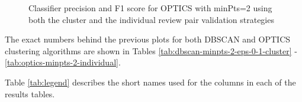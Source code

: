 \begin{figure}[ht]
\begin{center}
{\label{fig:subfig3}}
\caption{Classifier precision and F1 score for OPTICS with minPts=2 using both the cluster and the individual review pair validation strategies}    
\label{optics-minpts-2}
\end{center}
\end{figure}

\clearpage
The exact numbers behind the previous plots for both DBSCAN and OPTICS clustering algorithms are shown in Tables \ref{tab:dbscan-minpts-2-eps-0-1-cluster} - \ref{tab:optics-minpts-2-individual}. 

Table \ref{tab:legend} describes the short names used for the columns in each of the results tables. 


